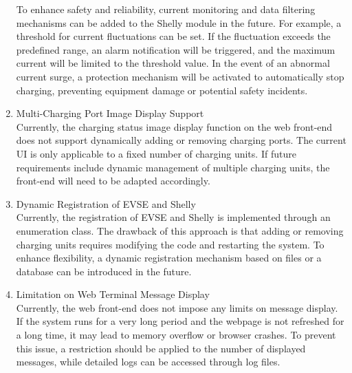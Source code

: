 \documentclass[
	english,
	ruledheaders=section,%
	class=report,%
	thesis={type=Report},%
	accentcolor=9c,%
	custommargins=true,%
	marginpar=false,%
	parskip=half-,%
	fontsize=11pt,%
	logofile={img/tuda_logo.pdf}, %
]{tudapub}
\begin{document}
\begin{enumerate}
To enhance safety and reliability, current monitoring and data filtering mechanisms can be added to the Shelly module in the future.  
For example, a threshold for current fluctuations can be set. If the fluctuation exceeds the predefined range, an alarm notification will be triggered, and the maximum current will be limited to the threshold value.  
In the event of an abnormal current surge, a protection mechanism will be activated to automatically stop charging, preventing equipment damage or potential safety incidents.


\item Multi-Charging Port Image Display Support\\
Currently, the charging status image display function on the web front-end does not support dynamically adding or removing charging ports. The current UI is only applicable to a fixed number of charging units. If future requirements include dynamic management of multiple charging units, the front-end will need to be adapted accordingly.


\item Dynamic Registration of EVSE and Shelly\\
Currently, the registration of EVSE and Shelly is implemented through an enumeration class. The drawback of this approach is that adding or removing charging units requires modifying the code and restarting the system. To enhance flexibility, a dynamic registration mechanism based on files or a database can be introduced in the future.


\item Limitation on Web Terminal Message Display\\
Currently, the web front-end does not impose any limits on message display. If the system runs for a very long period and the webpage is not refreshed for a long time, it may lead to memory overflow or browser crashes. To prevent this issue, a restriction should be applied to the number of displayed messages, while detailed logs can be accessed through log files.



\end{enumerate}
\end{document}
